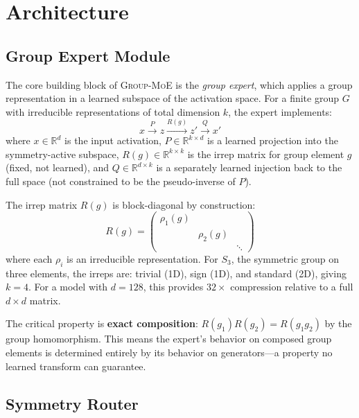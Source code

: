 \documentclass[10pt, letterpaper]{article}
\newcommand{\R}{\mathbb{R}}
\newcommand{\Rg}{R(g)}
\newcommand{\gmoe}{\textsc{Group-MoE}}
\begin{document}
\section{Architecture}
\label{sec:arch}

\subsection{Group Expert Module}

The core building block of \gmoe{} is the \emph{group expert}, which applies a group representation in a learned subspace of the activation space. For a finite group $G$ with irreducible representations of total dimension $k$, the expert implements:
\begin{equation}
    x \xrightarrow{P} z \xrightarrow{\Rg} z' \xrightarrow{Q} x'
    \label{eq:expert}
\end{equation}
where $x \in \R^d$ is the input activation, $P \in \R^{k \times d}$ is a learned projection into the symmetry-active subspace, $\Rg \in \R^{k \times k}$ is the irrep matrix for group element $g$ (fixed, not learned), and $Q \in \R^{d \times k}$ is a separately learned injection back to the full space (not constrained to be the pseudo-inverse of $P$).

The irrep matrix $\Rg$ is block-diagonal by construction:
\begin{equation}
    \Rg = \begin{pmatrix} \rho_1(g) & & \\ & \rho_2(g) & \\ & & \ddots \end{pmatrix}
\end{equation}
where each $\rho_i$ is an irreducible representation. For $S_3$, the symmetric group on three elements, the irreps are: trivial (1D), sign (1D), and standard (2D), giving $k = 4$. For a model with $d = 128$, this provides $32\times$ compression relative to a full $d \times d$ matrix.

The critical property is \textbf{exact composition}: $R(g_1) R(g_2) = R(g_1 g_2)$ by the group homomorphism. This means the expert's behavior on composed group elements is determined entirely by its behavior on generators---a property no learned transform can guarantee.

\subsection{Symmetry Router}
\end{document}
